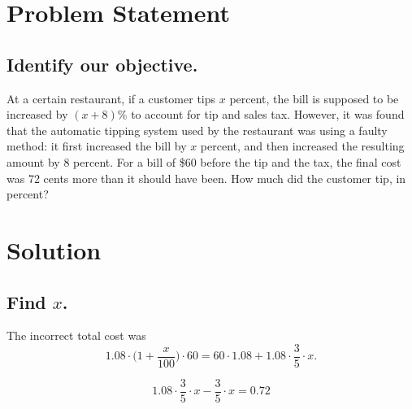 \documentclass{beamer} %
\begin{document}
\begin{frame} %
  \titlepage
\end{frame}

\section{Problem Statement}

\subsection*{Identify our objective.}

\begin{frame}
At a certain restaurant, if a customer tips $x$ percent, the bill is supposed to be increased by $(x + 8) \%$ to account for tip and sales tax. However, it was found that the automatic tipping system used by the restaurant was using a faulty method: it first increased the bill by $x$ percent, and then increased the resulting amount by $8$ percent. For a bill of \$60 before the tip and the tax, the final cost was 72 cents more than it should have been. How much did the customer tip, in percent?
\end{frame}

\section{Solution}

\subsection*{Find \texorpdfstring{$x$}{x}.}

\begin{frame}
The incorrect total cost was
\[
1.08 \cdot \biggl(1+\frac{x}{100}\biggr) \cdot 60 = 60 \cdot 1.08 + 1.08 \cdot \frac{3}{5}\cdot x. 
\]
\end{frame}

\begin{frame}{}
\[
1.08 \cdot \frac{3}{5} \cdot x - \frac{3}{5} \cdot x = 0.72
\]
\end{frame}
\end{document}
